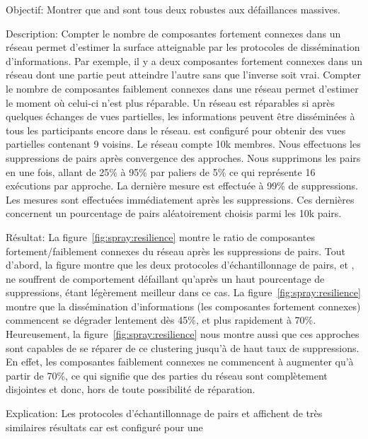 \begin{asparadesc}
\item [Objectif:] Montrer que \SPRAY and \CYCLON sont tous deux robustes aux
  défaillances massives.
\item [Description:] Compter le nombre de composantes fortement connexes dans un
  réseau permet d'estimer la surface atteignable par les protocoles de
  dissémination d'informations. Par exemple, il y a deux composantes fortement
  connexes dans un réseau dont une partie peut atteindre l'autre sans que
  l'inverse soit vrai. Compter le nombre de composantes faiblement connexes dans
  une réseau permet d'estimer le moment où celui-ci n'est plus réparable. Un
  réseau est réparables si après quelques échanges de vues partielles, les
  informations peuvent être disséminées à tous les participants encore dans le
  réseau. \CYCLON est configuré pour obtenir des vues partielles contenant 9
  voisins. Le réseau compte 10k membres. Nous effectuons les suppressions de
  pairs après convergence des approches. Nous supprimons les pairs en une fois,
  allant de 25\% à 95\% par paliers de 5\% ce qui représente 16 exécutions par
  approche. La dernière mesure est effectuée à 99\% de suppressions. Les mesures
  sont effectuées immédiatement après les suppressions. Ces dernières concernent
  un pourcentage de pairs aléatoirement choisis parmi les 10k pairs.
\item [Résultat:] La figure~\ref{fig:spray:resilience} montre le ratio de
  composantes fortement/faiblement connexes du réseau après les suppressions de
  pairs. Tout d'abord, la figure montre que les deux protocoles
  d'échantillonnage de pairs, \SPRAY et \CYCLON, ne souffrent de comportement
  défaillant qu'après un haut pourcentage de suppressions, \CYCLON étant
  légèrement meilleur dans ce cas. La figure~\ref{fig:spray:resilience} montre
  que la dissémination d'informations (les composantes fortement connexes)
  commencent se dégrader lentement dès 45\%, et plus rapidement à
  70\%. Heureusement, la figure~\ref{fig:spray:resilience} nous montre aussi que
  ces approches sont capables de se réparer de ce clustering jusqu'à de haut
  taux de suppressions. En effet, les composantes faiblement connexes ne
  commencent à augmenter qu'à partir de 70\%, ce qui signifie que des parties du
  réseau sont complètement disjointes et donc, hors de toute possibilité de
  réparation.
\item [Explication:] Les protocoles d'échantillonnage de pairs \CYCLON et \SPRAY
  affichent de très similaires résultats car \CYCLON est configuré pour une

\end{asparadesc}
